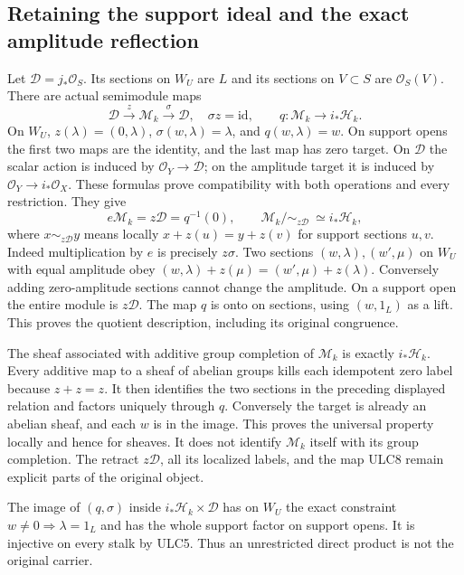 \subsection{Retaining the support ideal and the exact amplitude reflection}
Let $\mathcal D=j_*\mathcal O_S$. Its sections on $W_U$ are $L$
and its sections on $V\subset S$ are $\mathcal O_S(V)$.
There are actual semimodule maps
\begin{equation}\tag{ULC9}
 \mathcal D\xrightarrow{z}\mathcal M_k
 \xrightarrow{\sigma}\mathcal D,\quad\sigma z=\mathrm{id},
 \qquad q:\mathcal M_k\longrightarrow i_*\mathcal H_k.
\end{equation}
On $W_U$, $z(\lambda)=(0,\lambda)$, $\sigma(w,\lambda)=\lambda$,
and $q(w,\lambda)=w$. On support opens the first two maps are the
identity, and the last map has zero target. On $\mathcal D$ the
scalar action is induced by $\mathcal O_Y\to\mathcal D$; on the
amplitude target it is induced by $\mathcal O_Y\to i_*\mathcal O_X$.
These formulas prove compatibility with both operations and every
restriction. They give
\begin{equation}\tag{ULC10}
 e\mathcal M_k=z\mathcal D=q^{-1}(0),\qquad
 \mathcal M_k/\!\sim_{z\mathcal D}\ \simeq i_*\mathcal H_k,
\end{equation}
where $x\sim_{z\mathcal D}y$ means locally
$x+z(u)=y+z(v)$ for support sections $u,v$.
Indeed multiplication by $e$ is precisely $z\sigma$. Two sections
$(w,\lambda),(w',\mu)$ on $W_U$ with equal amplitude obey
$(w,\lambda)+z(\mu)=(w',\mu)+z(\lambda)$. Conversely adding
zero-amplitude sections cannot change the amplitude. On a support
open the entire module is $z\mathcal D$. The map $q$ is onto
on sections, using $(w,1_L)$ as a lift. This proves the quotient
description, including its original congruence.

The sheaf associated with additive group completion of $\mathcal M_k$
is exactly $i_*\mathcal H_k$. Every additive map to a sheaf of
abelian groups kills each idempotent zero label because $z+z=z$.
It then identifies the two sections in the preceding displayed
relation and factors uniquely through $q$. Conversely the target
is already an abelian sheaf, and each $w$ is in the image. This
proves the universal property locally and hence for sheaves.
It does not identify $\mathcal M_k$ itself with its group completion.
The retract $z\mathcal D$, all its localized labels, and the map
ULC8 remain explicit parts of the original object.

The image of $(q,\sigma)$ inside
$i_*\mathcal H_k\times\mathcal D$ has on $W_U$ the exact constraint
$w\ne0\Rightarrow\lambda=1_L$ and has the whole support factor
on support opens. It is injective on every stalk by ULC5. Thus an
unrestricted direct product is not the original carrier.

